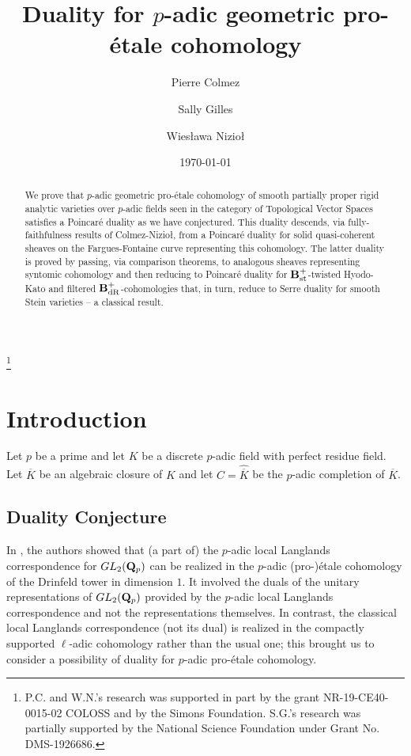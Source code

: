 \documentclass[10pt,reqno]{amsart}
\theoremstyle{definition}
\theoremstyle{remark}
\newcommand{\ovk}{\overline{K} }
\newcommand{\dr}{\operatorname{dR} }
\newcommand{\st}{\operatorname{st} }
\newcommand{\wh}{\widehat}
\numberwithin{equation}{section}
\def\Q{{\bf Q}} \def\Z{{\bf Z}}
\def\Cbreve{$C$, $\breve{C}$}
\numberwithin{equation}{section}
\begin{document}
\title[Duality  for  $p$-adic geometric pro-\'etale cohomology]
 {Duality  for $p$-adic geometric pro-\'etale cohomology}
 \author{Pierre Colmez} 
\address{CNRS, IMJ-PRG, Sorbonne Universit\'e, 4 place Jussieu, 75005 Paris, France}
\author{Sally Gilles}
\address{Universit\"at Duisburg-Essen,  Fakult\"at f\"ur Mathematik, Thea-Leymann-Str. 9, 45127 Essen, Deutschland}
\author{Wies{\l}awa Nizio{\l}}
\address{CNRS, IMJ-PRG, Sorbonne Universit\'e, 4 place Jussieu, 75005 Paris, France}
 \date{\today}
\thanks{P.C. and W.N.'s research was supported in part by the grant NR-19-CE40-0015-02 COLOSS and by the Simons Foundation. S.G.'s research was partially supported by the National Science Foundation under Grant No. DMS-1926686. 
}
\maketitle
 \begin{abstract} We prove that $p$-adic geometric pro-\'etale cohomology of smooth partially proper rigid analytic varieties over $p$-adic fields seen in the category of Topological Vector Spaces satisfies a Poincar\'e duality as we have conjectured. This duality descends, via fully-faithfulness results of Colmez-Nizio{\l},  from a Poincar\'e duality for 
 solid quasi-coherent sheaves on the Fargues-Fontaine curve representing this cohomology. The latter duality is proved by passing, via comparison theorems, to analogous sheaves representing syntomic cohomology and then reducing to Poincar\'e duality for $\B^+_{\st}$-twisted Hyodo-Kato and filtered  $\B^+_{\dr}$-cohomologies that, in turn, reduce to Serre duality for smooth Stein varieties -- a classical result. 
\end{abstract}

\tableofcontents
\section{Introduction}
 Let $p$ be a prime and let $K$ be a discrete $p$-adic field
with  perfect residue field. 
Let $\ovk$ be an algebraic closure of $K$ and \index{C@\Cbreve}let $C=\wh{\ovk}$ be the $p$-adic completion of $\ovk$.  
 \subsection{Duality Conjecture}
 In \cite{CDN1,CDN5}, the authors showed that (a part of) the $p$-adic local Langlands correspondence for ${\rm GL}_2(\Q_p)$ can be realized in the $p$-adic (pro-)\'etale cohomology of the Drinfeld 
tower in dimension $1$. It involved the duals of the unitary representations of ${\rm GL}_2(\Q_p)$
provided by the $p$-adic local Langlands correspondence and not the representations themselves.
In contrast,
the classical local Langlands correspondence (not its dual)
is realized in the compactly supported $\ell$-adic cohomology rather than the usual one; 
this brought us to consider a possibility of duality for $p$-adic pro-\'etale cohomology. 
 
\end{document}
